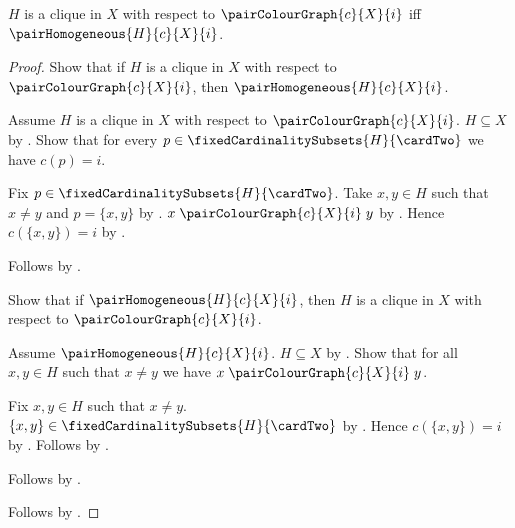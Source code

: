 \begin{theorem}\label{pair_colour_graph_clique_iff}
    $H$ is a clique in $X$ with respect to $\pairColourGraph{c}{X}{i}$ iff
        $\pairHomogeneous{H}{c}{X}{i}$.
\end{theorem}
\begin{proof}
    Show that if $H$ is a clique in $X$ with respect to
            $\pairColourGraph{c}{X}{i}$, then
        $\pairHomogeneous{H}{c}{X}{i}$.
    \begin{subproof}
        Assume $H$ is a clique in $X$ with respect to
            $\pairColourGraph{c}{X}{i}$.
        $H\subseteq X$ by .
        Show that for every
            $p\in\fixedCardinalitySubsets{H}{\cardTwo}$ we have
            $c(p)=i$.
        \begin{subproof}
            Fix $p\in\fixedCardinalitySubsets{H}{\cardTwo}$.
            Take $x,y\in H$ such that $x\neq y$ and $p=\{x,y\}$ by
                .
            $x\mathrel{\pairColourGraph{c}{X}{i}}y$ by
                .
            Hence $c(\{x,y\})=i$ by
                .
        \end{subproof}
        Follows by .
    \end{subproof}
    Show that if $\pairHomogeneous{H}{c}{X}{i}$, then
        $H$ is a clique in $X$ with respect to
            $\pairColourGraph{c}{X}{i}$.
    \begin{subproof}
        Assume $\pairHomogeneous{H}{c}{X}{i}$.
        $H\subseteq X$ by .
        Show that for all $x,y\in H$ such that $x\neq y$ we have
            $x\mathrel{\pairColourGraph{c}{X}{i}}y$.
        \begin{subproof}
            Fix $x,y\in H$ such that $x\neq y$.
            $\{x,y\}\in\fixedCardinalitySubsets{H}{\cardTwo}$ by
                .
            Hence $c(\{x,y\})=i$ by
                .
            Follows by .
        \end{subproof}
        Follows by .
    \end{subproof}
    Follows by \auto.
\end{proof}

